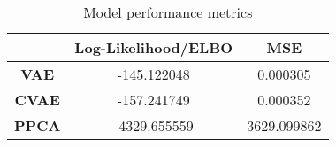 \begin{table}
\centering
\caption{Model performance metrics}
\label{table:metrics}
\begin{tabular}{ccc}
\toprule
{} &  \textbf{Log-Likelihood/ELBO} &  \textbf{MSE} \\
\midrule
\textbf{VAE } &                   -145.122048 &      0.000305 \\
\textbf{CVAE} &                   -157.241749 &      0.000352 \\
\textbf{PPCA} &                  -4329.655559 &   3629.099862 \\
\bottomrule
\end{tabular}
\end{table}
